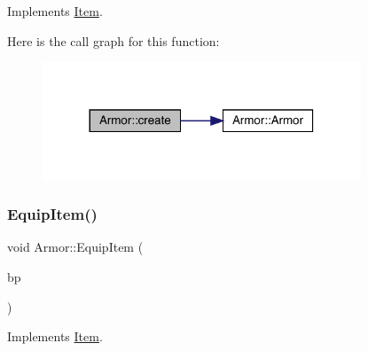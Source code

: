 Implements \mbox{\hyperlink{class_item_a17b3fa0cef44ada961e0d3c65e1de864}{Item}}.

Here is the call graph for this function\+:
\nopagebreak
\begin{figure}[H]
\begin{center}
\leavevmode
\includegraphics[width=269pt]{d9/d76/class_armor_a21de0acaa6ecdb6f5937166b83da9b01_cgraph}
\end{center}
\end{figure}
\mbox{\label{class_armor_a697e23862a5a6bb32fc5b1b143d61f58}} 
\subsubsection{\texorpdfstring{Equip\+Item()}{EquipItem()}}
{\footnotesize\ttfamily void Armor\+::\+Equip\+Item (\begin{DoxyParamCaption}\item[{\mbox{\hyperlink{class_body_part}{Body\+Part}} \&}]{bp }\end{DoxyParamCaption})\hspace{0.3cm}{\ttfamily [virtual]}}



Implements \mbox{\hyperlink{class_item_af4b9caf8fcfc22bbde13bf6c3505b35c}{Item}}.

